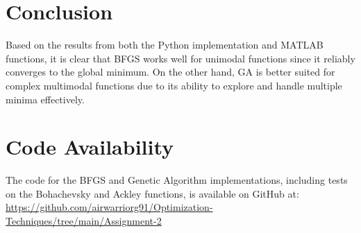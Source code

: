 \documentclass[12pt,a4paper,oneside]{paper} %
\begin{document}
\section{Conclusion}
\noindent Based on the results from both the Python implementation and MATLAB functions, it is clear that BFGS works well for unimodal functions since it reliably converges to the global minimum. On the other hand, GA is better suited for complex multimodal functions due to its ability to explore and handle multiple minima effectively.

\section{Code Availability}
The code for the BFGS and Genetic Algorithm implementations, including tests on the Bohachevsky and Ackley functions, is available on GitHub at:  
\url{https://github.com/airwarriorg91/Optimization-Techniques/tree/main/Assignment-2}


\end{document}
